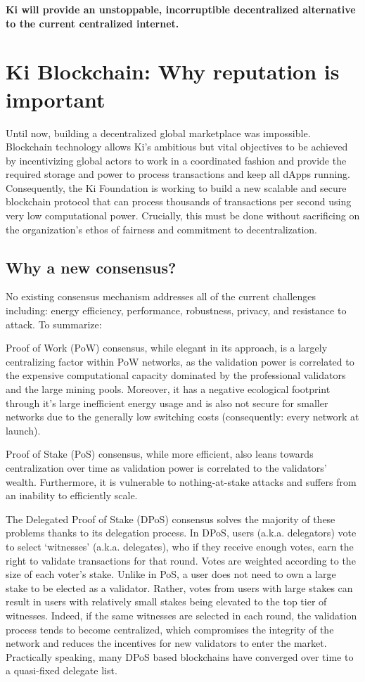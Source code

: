 \begin{center}
    \textbf{Ki will provide an unstoppable, incorruptible decentralized alternative to the current centralized internet.}
\end{center}

\section{Ki Blockchain: Why reputation is important}
\label{sec:kiblockchain}
Until now, building a decentralized global marketplace was impossible. Blockchain technology allows Ki’s ambitious but vital objectives to be achieved by incentivizing global actors to work in a coordinated fashion and provide the required storage and power to process transactions and keep all dApps running. Consequently, the Ki Foundation is working to build a new scalable and secure blockchain protocol that can process thousands of transactions per second using very low computational power. Crucially, this must be done without sacrificing on the organization's ethos of fairness and commitment to decentralization. 

\subsection{Why a new consensus?}
\label{sec:kiblockchainwhy}
No existing consensus mechanism addresses all of the current challenges including: energy efficiency, performance, robustness, privacy, and resistance to attack. To summarize: 

Proof of Work (PoW) consensus, while elegant in its approach, is a largely centralizing factor within PoW networks, as the validation power is correlated to the expensive computational capacity dominated by the professional validators and the large mining pools. Moreover, it has a negative ecological footprint through it's large inefficient energy usage and is also not secure for smaller networks due to the generally low switching costs (consequently: every network at launch). 

Proof of Stake (PoS) consensus, while more efficient, also leans towards centralization over time  as validation power is correlated to the validators' wealth. Furthermore, it is vulnerable to nothing-at-stake attacks and suffers from an inability to efficiently scale.

The Delegated Proof of Stake (DPoS) consensus solves the majority of these problems thanks to its delegation process. In DPoS, users (a.k.a. delegators) vote to select ‘witnesses’ (a.k.a. delegates), who if they receive enough votes, earn the right to validate transactions for that round. Votes are weighted according to the size of each voter's stake. Unlike in PoS, a user does not need to own a large stake to be elected as a validator. Rather, votes from users with large stakes can result in users with relatively small stakes being elevated to the top tier of witnesses. Indeed, if the same witnesses are selected in each round, the validation process tends to become centralized, which compromises the integrity of the network and reduces the incentives for new validators to enter the market. Practically speaking, many DPoS based blockchains have converged over time to a quasi-fixed delegate list. 

